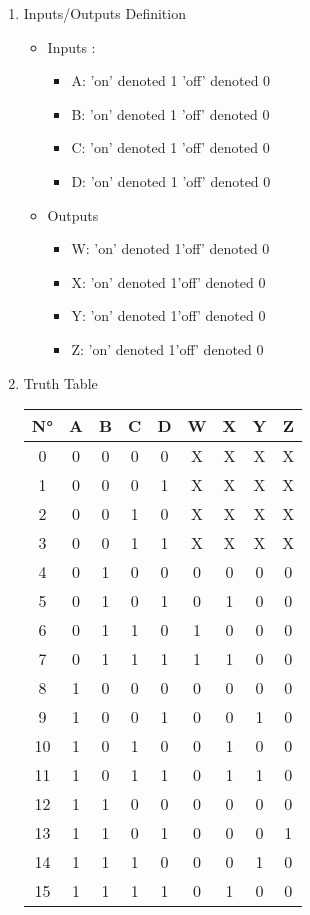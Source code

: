 \begin{enumerate}
\item Inputs/Outputs  Definition
\begin{itemize}
\item Inputs :
\begin{itemize}
\item A: \qquad 'on' denoted 1 \qquad 'off' denoted 0 
\item B: \qquad 'on' denoted 1 \qquad 'off' denoted 0 
\item C: \qquad 'on' denoted 1 \qquad 'off' denoted 0 
\item D: \qquad 'on' denoted 1 \qquad 'off' denoted 0 
\end{itemize}
\item Outputs 
\begin{itemize}
\item W: \qquad 'on' denoted 1\qquad 'off' denoted  0
\item X: \qquad 'on' denoted 1\qquad 'off' denoted  0
\item Y: \qquad 'on' denoted 1\qquad 'off' denoted  0
\item Z: \qquad 'on' denoted 1\qquad 'off' denoted  0
\end{itemize}
\end{itemize}
\item Truth Table 

        \begin{tabular}{|c|c|c|c|c||c|c|c|c|}

    \toprule

        N° &A & B & C & D & W & X & Y & Z\\ \midrule
0 & 0 & 0 & 0 & 0 & X & X & X & X\\
1 & 0 & 0 & 0 & 1 & X & X & X & X\\
2 & 0 & 0 & 1 & 0 & X & X & X & X\\
3 & 0 & 0 & 1 & 1 & X & X & X & X\\
\midrule
4 & 0 & 1 & 0 & 0 & 0 & 0 & 0 & 0\\
5 & 0 & 1 & 0 & 1 & 0 & 1 & 0 & 0\\
6 & 0 & 1 & 1 & 0 & 1 & 0 & 0 & 0\\
7 & 0 & 1 & 1 & 1 & 1 & 1 & 0 & 0\\
\midrule
8 & 1 & 0 & 0 & 0 & 0 & 0 & 0 & 0\\
9 & 1 & 0 & 0 & 1 & 0 & 0 & 1 & 0\\
10 & 1 & 0 & 1 & 0 & 0 & 1 & 0 & 0\\
11 & 1 & 0 & 1 & 1 & 0 & 1 & 1 & 0\\
\midrule
12 & 1 & 1 & 0 & 0 & 0 & 0 & 0 & 0\\
13 & 1 & 1 & 0 & 1 & 0 & 0 & 0 & 1\\
14 & 1 & 1 & 1 & 0 & 0 & 0 & 1 & 0\\
15 & 1 & 1 & 1 & 1 & 0 & 1 & 0 & 0\\
\bottomrule


\end{tabular}
\end{enumerate}
